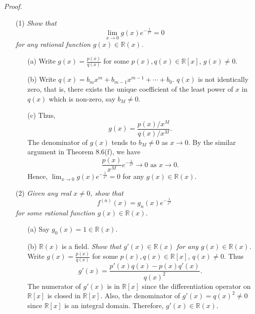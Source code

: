 \documentclass{article}
\begin{document}
\emph{Proof.}
\begin{enumerate}
\item[(1)]
\emph{Show that
\[
  \lim_{x \rightarrow 0} g(x) e^{-\frac{1}{x^2}} = 0
\]
for any rational function $g(x) \in \mathbb{R}(x)$.}
  \begin{enumerate}
  \item[(a)]
  Write $g(x) = \frac{p(x)}{q(x)}$ for some $p(x), q(x) \in \mathbb{R}[x]$,
  $g(x) \neq 0$.

  \item[(b)]
  Write $q(x) = b_m x^m + b_{m - 1} x^{m - 1} + \cdots + b_0$.
  $q(x)$ is not identically zero, that is, there exists the unique coefficient
  of the least power of $x$ in $q(x)$ which is non-zero, say $b_M \neq 0$.

  \item[(c)]
  Thus,
  \[
    g(x) = \frac{p(x)/x^M}{q(x)/x^M}.
  \]
  The denominator of $g(x)$ tends to $b_M \neq 0$ as $x \rightarrow 0$.
  By the similar argument in Theorem 8.6(f), we have
  \[
    \frac{p(x)}{x^M} e^{-\frac{1}{x^2}} \rightarrow 0 \text{ as } x \rightarrow 0.
  \]
  Hence, $\lim_{x \rightarrow 0} g(x) e^{-\frac{1}{x^2}} = 0$
  for any $g(x) \in \mathbb{R}(x)$.
  \end{enumerate}

\item[(2)]
\emph{Given any real $x \neq 0$, show that
\[
  f^{(n)}(x) = g_n(x) e^{-\frac{1}{x^2}}
\]
for some rational function $g(x) \in \mathbb{R}(x)$.}
  \begin{enumerate}
  \item[(a)]
  Say $g_0(x) = 1 \in \mathbb{R}(x)$.

  \item[(b)]
  $\mathbb{R}(x)$ is a field.
  \emph{Show that $g'(x) \in \mathbb{R}(x)$ for any $g(x) \in \mathbb{R}(x)$.}
  Write $g(x) = \frac{p(x)}{q(x)}$ for some $p(x), q(x) \in \mathbb{R}[x]$, $q(x) \neq 0$.
  Thus
  \[
    g'(x) = \frac{p'(x)q(x) - p(x)q'(x)}{q(x)^2}.
  \]
  The numerator of $g'(x)$ is in $\mathbb{R}[x]$ since
  the differentiation operator on $\mathbb{R}[x]$ is closed in $\mathbb{R}[x]$.
  Also, the denominator of $g'(x) = q(x)^2 \neq 0$
  since $\mathbb{R}[x]$ is an integral domain.
  Therefore, $g'(x) \in \mathbb{R}(x)$.


\end{enumerate}
\end{enumerate}
\end{document}
